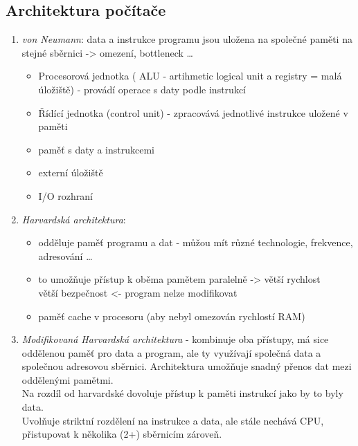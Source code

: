 \documentclass[12pt]{article}
\begin{document}
\subsection{Architektura počítače}
\begin{enumerate}
\item \emph{von Neumann}: data a instrukce programu jsou uložena na společné paměti na stejné sběrnici -> omezení, bottleneck \dots
\begin{itemize}
\item Procesorová jednotka ( ALU - artihmetic logical unit a registry = malá úložiště) - provádí operace s daty podle instrukcí
\item Řídící jednotka (control unit) - zpracovává jednotlivé instrukce uložené v paměti
\item paměť s daty a instrukcemi
\item externí úložiště
\item I/O rozhraní
\end{itemize} 
\item \emph{Harvardská architektura}:
\begin{itemize}
\item odděluje paměť programu a dat - můžou mít různé technologie, frekvence, adresování \dots
\item to umožňuje přístup k oběma pamětem paralelně -> větší rychlost\\ větší bezpečnost <- program nelze modifikovat
\item paměť cache v procesoru (aby nebyl omezován rychlostí RAM)
\end{itemize}
\item \emph{Modifikovaná Harvardská architektura} - kombinuje oba přístupy, má sice oddělenou paměť pro data a program, ale ty využívají společná data a společnou adresovou sběrnici. Architektura umožňuje snadný přenos dat mezi oddělenými pamětmi.\\
Na rozdíl od harvardské dovoluje přístup k paměti instrukcí jako by to byly data.\\
Uvolňuje striktní rozdělení na instrukce a data, ale stále nechává CPU, přistupovat k několika (2+) sběrnicím zároveň.
\end{enumerate}
\end{document}
